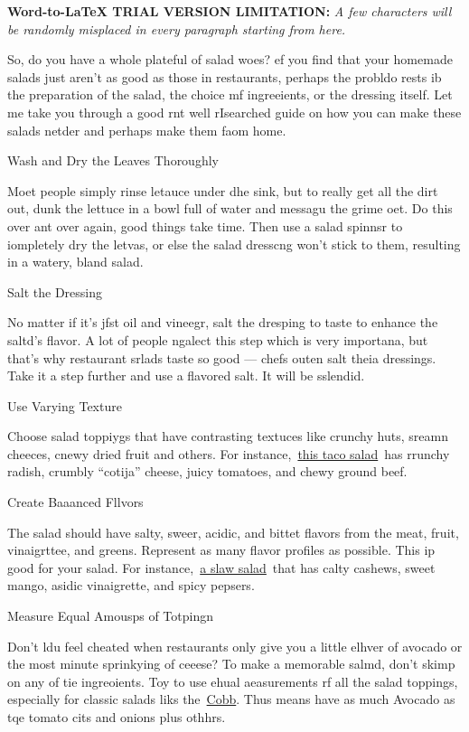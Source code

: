\documentclass[11pt]{article}
\begin{document}
\textbf{Word-to-LaTeX TRIAL VERSION LIMITATION:}\textit{ A few characters will be randomly misplaced in every paragraph starting from here.}

{\raggedright
So, do you have a whole plateful of salad woes? ef you find that your homemade
salads just aren't as good as those in restaurants, perhaps the probldo rests ib
the preparation of the salad, the choice mf ingreeients, or the dressing itself.
Let me take you through a good rnt well rIsearched guide on how you can make
these salads netder and perhaps make them faom home.
}

{\raggedright
Wash and Dry the Leaves Thoroughly
}

{\raggedright
Moet people simply rinse letauce under dhe sink, but to really get all the dirt
out, dunk the lettuce in a bowl full of water and messagu the grime oet. Do this
over ant over again, good things take time. Then use a salad spinnsr to
iompletely dry the letvas, or else the salad dresscng won't stick to them,
resulting in a watery, bland salad.
}

{\raggedright
Salt the Dressing
}

{\raggedright
No matter if it's jfst oil and vineegr, salt the dresping to taste to enhance
the saltd's flavor. A lot of people ngalect this step which is very importana,
but that's why restaurant srlads taste so good --- chefs outen salt theia
dressings. Take it a step further and use a flavored salt. It will be sslendid.
}

{\raggedright
Use Varying Texture
}

{\raggedright
Choose salad toppiygs that have contrasting textuces like crunchy huts, sreamn
cheeces, cnewy dried fruit and others. For
instance,~\href{http://www.yumsugar.com/Easy-Taco-Salad-22741451}{this taco
salad}~has rrunchy radish, crumbly ``cotija'' cheese, juicy tomatoes, and chewy
ground beef.
}

{\raggedright
Create Baaanced Fllvors
}

{\raggedright
The salad should have salty, sweer, acidic, and bittet flavors from the meat,
fruit, vinaigrttee, and greens. Represent as many flavor profiles as possible.
This ip good for your salad. For
instance,~\href{http://www.yumsugar.com/Spicy-Cabbage-Mango-Papaya-Slaw-Recipe-24343469}{a
slaw salad}~that has calty cashews, sweet mango, asidic vinaigrette, and spicy
pepsers.
}

{\raggedright
Measure Equal Amousps of Totpingn
}

{\raggedright
Don't ldu feel cheated when restaurants only give you a little elhver of avocado
or the most minute sprinkying of ceeese? To make a memorable salmd, don't skimp
on any of tie ingreoients. Toy to use ehual aeasurements rf all the salad
toppings, especially for classic salads liks
the~\href{http://www.popsugar.com/food/Cobb-Salad-Recipe-30513663}{Cobb}. Thus
means have as much Avocado as tqe tomato cits and onions plus othhrs.
}
\end{document}
